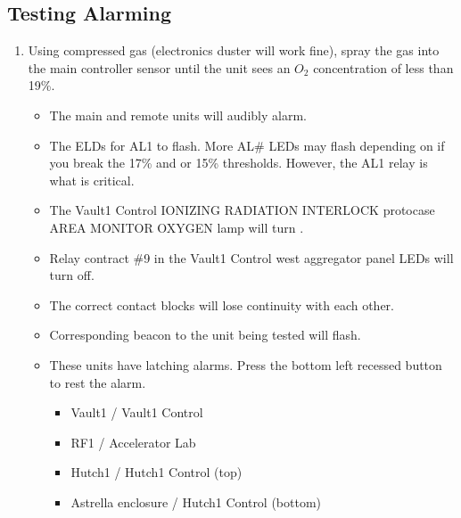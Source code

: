 \documentclass[letterpaper,10pt,english]{sphinxmanual}
\begin{document}
\subsection{Testing Alarming}
\label{\detokenize{testing_documentation/O2_testing:testing-alarming}}\begin{enumerate}
%
\item {} 
\sphinxAtStartPar
Using compressed gas (electronics duster will work fine), spray the gas into the main controller sensor until the unit sees an \(O_2\) concentration of less than 19\%.
\begin{itemize}
\item {} 
\sphinxAtStartPar
The main and remote units will audibly alarm.

\item {} 
\sphinxAtStartPar
The ELDs for AL1 to flash. More AL\# LEDs may flash depending on if you break the 17\% and or 15\% thresholds.
However, the AL1 relay is what is critical.

\item {} 
\sphinxAtStartPar
The Vault\sphinxhyphen{}1 Control IONIZING RADIATION INTERLOCK protocase AREA MONITOR OXYGEN lamp will turn .

\item {} 
\sphinxAtStartPar
Relay contract \#9 in the Vault\sphinxhyphen{}1 Control west aggregator panel LEDs will turn off.

\item {} 
\sphinxAtStartPar
The correct  contact blocks will lose continuity with each other.

\item {} 
\sphinxAtStartPar
Corresponding  beacon to the unit being tested will flash.

\item {} 
\sphinxAtStartPar
These units have latching alarms.
Press the bottom left recessed button to rest the alarm.
\begin{itemize}
\item {} 
\sphinxAtStartPar
Vault\sphinxhyphen{}1 / Vault\sphinxhyphen{}1 Control

\item {} 
\sphinxAtStartPar
RF\sphinxhyphen{}1 / Accelerator Lab

\item {} 
\sphinxAtStartPar
Hutch\sphinxhyphen{}1 / Hutch\sphinxhyphen{}1 Control (top)

\item {} 
\sphinxAtStartPar
Astrella enclosure / Hutch\sphinxhyphen{}1 Control (bottom)

\end{itemize}

\end{itemize}

\end{enumerate}
\end{document}
